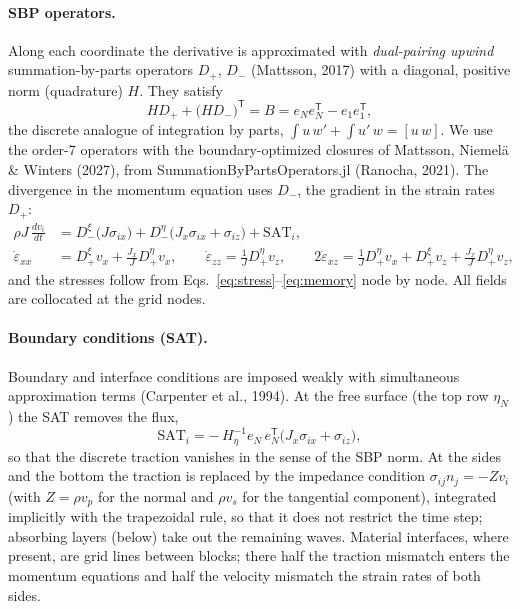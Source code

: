 \paragraph{SBP operators.} Along each coordinate the derivative is approximated with \emph{dual-pairing upwind}
summation-by-parts operators $D_+$, $D_-$ (Mattsson, 2017) with a diagonal, positive norm (quadrature) $H$. They satisfy
\begin{equation}
  H D_+ + \big(H D_-\big)^{\mathsf T} = B = e_N e_N^{\mathsf T} - e_1 e_1^{\mathsf T},
  \label{eq:sbp}
\end{equation}
the discrete analogue of integration by parts, $\int u\,w' + \int u'\,w = [u\,w]$. We use the order-7 operators with the
boundary-optimized closures of Mattsson, Niemelä \& Winters (2027), from SummationByPartsOperators.jl (Ranocha, 2021). The
divergence in the momentum equation uses $D_-$, the gradient in the strain rates $D_+$:
\begin{align}
  \rho J\,\frac{d v_i}{dt} &= D_-^{\xi}\big(J\sigma_{ix}\big) + D_-^{\eta}\big(J_x\sigma_{ix} + \sigma_{iz}\big)
     + \mathrm{SAT}_i , \label{eq:semi_momentum}\\
  \dot\varepsilon_{xx} &= D_+^{\xi} v_x + \frac{J_x}{J} D_+^{\eta} v_x, \qquad
  \dot\varepsilon_{zz} = \frac{1}{J} D_+^{\eta} v_z, \qquad
  2\dot\varepsilon_{xz} = \frac{1}{J} D_+^{\eta} v_x + D_+^{\xi} v_z + \frac{J_x}{J} D_+^{\eta} v_z ,
  \label{eq:semi_strain}
\end{align}
and the stresses follow from Eqs.~\eqref{eq:stress}--\eqref{eq:memory} node by node. All fields are collocated at the
grid nodes.

\paragraph{Boundary conditions (SAT).} Boundary and interface conditions are imposed weakly with simultaneous
approximation terms (Carpenter et al., 1994). At the free surface (the top row $\eta_N$) the SAT removes the flux,
\begin{equation}
  \mathrm{SAT}_i = -\,H_\eta^{-1} e_N\, e_N^{\mathsf T}\big(J_x\sigma_{ix} + \sigma_{iz}\big),
  \label{eq:sat_free}
\end{equation}
so that the discrete traction vanishes in the sense of the SBP norm. At the sides and the bottom the traction is replaced by
the impedance condition $\sigma_{ij} n_j = -Z v_i$ (with $Z = \rho v_p$ for the normal and $\rho v_s$ for the tangential
component), integrated implicitly with the trapezoidal rule, so that it does not restrict the time step; absorbing layers
(below) take out the remaining waves. Material interfaces, where present, are grid lines between blocks; there half the
traction mismatch enters the momentum equations and half the velocity mismatch the strain rates of both sides.

